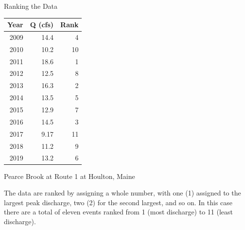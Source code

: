 \documentclass[ignorenonframetext,aspectratio=169]{beamer}
\begin{document}
\begin{frame}{Ranking the Data}
  \begin{minipage}{.5\textwidth}
    \begin{tabular}{r r r}
      Year & Q (cfs) & Rank\\ \hline
      2009 & 14.4    & 4  \\
      2010 & 10.2    & 10 \\
      2011 & 18.6    & 1  \\
      2012 & 12.5    & 8  \\
      2013 & 16.3    & 2  \\
      2014 & 13.5    & 5  \\
      2015 & 12.9    & 7  \\
      2016 & 14.5    & 3  \\
      2017 & 9.17    & 11 \\
      2018 & 11.2    & 9  \\
      2019 & 13.2    & 6  \\ \hline
    \end{tabular}

    \scriptsize  Pearce Brook at Route 1 at Houlton, Maine
  \end{minipage}
  \begin{minipage}{.48\textwidth}
    The data are ranked by assigning a whole number, with one (1) assigned to the largest peak discharge, two (2) for the second largest, and so on. In this case there are a total of eleven events ranked from 1 (most discharge) to 11 (least discharge).
  \end{minipage}
\end{frame}
\end{document}

